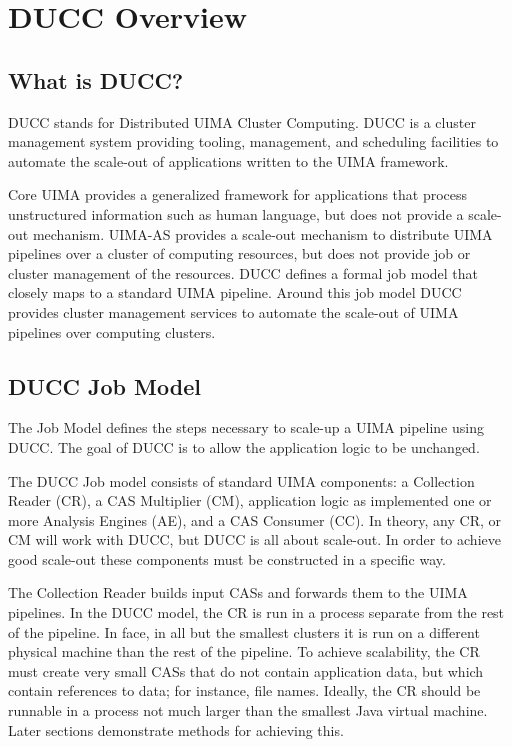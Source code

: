 \ifpdf
\else
{}
\fi
\chapter{DUCC Overview}

    \section{What is DUCC?}

    DUCC stands for Distributed UIMA Cluster Computing. DUCC is a cluster management system
    providing tooling, management, and scheduling facilities to automate the scale-out of
    applications written to the UIMA framework.

    Core UIMA provides a generalized framework for applications that process unstructured
    information such as human language, but does not provide a scale-out mechanism. UIMA-AS provides
    a scale-out mechanism to distribute UIMA pipelines over a cluster of computing resources, but
    does not provide job or cluster management of the resources. DUCC defines a formal job model
    that closely maps to a standard UIMA pipeline. Around this job model DUCC provides cluster
    management services to automate the scale-out of UIMA pipelines over computing clusters.

    \section{DUCC Job Model}

    The Job Model defines the steps necessary to scale-up a UIMA pipeline using DUCC.  The goal of
    DUCC is to allow the application logic to be unchanged.

    The DUCC Job model consists of standard UIMA components: a Collection Reader (CR), a CAS
    Multiplier (CM), application logic as implemented one or more Analysis Engines (AE), and a CAS
    Consumer (CC).  In theory, any CR, or CM will work with DUCC, but DUCC is all about scale-out.  In
    order to achieve good scale-out these components must be constructed in a specific way.

    The Collection Reader builds input CASs and forwards them to the UIMA pipelines.  In the DUCC
    model, the CR is run in a process separate from the rest of the pipeline. In face, in all but the
    smallest clusters it is run on a different physical machine than the rest of the pipeline.  To
    achieve scalability, the CR must create very small CASs that do not contain application data,
    but which contain references to data; for instance, file names.  Ideally, the CR should be
    runnable in a process not much larger than the smallest Java virtual machine.  Later sections
    demonstrate methods for achieving this.

